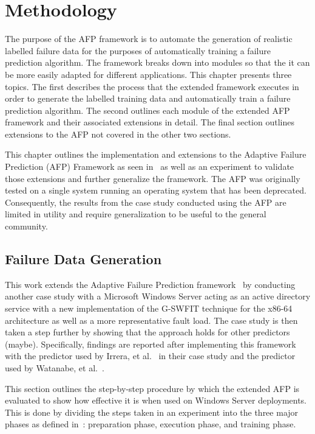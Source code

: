 \chapter{Methodology} \label{chapter3}
The purpose of the AFP framework is to automate the generation of realistic
labelled failure data for the purposes of automatically training a failure
prediction algorithm.  The framework breaks down into modules so that the it
can be more easily adapted for different applications.  This chapter presents
three topics.  The first describes the process that the extended framework
executes in order to generate the labelled training data and automatically
train a failure prediction algorithm.  The second outlines each module of the
extended AFP framework and their associated extensions in detail.  The final
section outlines extensions to the AFP not covered in the other two sections.

This chapter outlines the implementation and extensions to the Adaptive Failure
Prediction (AFP) Framework as seen in~\cite{irrera2015} as well as an
experiment to validate those extensions and further generalize the framework.
The AFP was originally tested on a single system running an operating system
that has been deprecated.  Consequently, the results from the case study
conducted using the AFP are limited in utility and require generalization to be
useful to the general community.

\section{Failure Data Generation} \label{sec:generation}
This work extends the Adaptive Failure Prediction framework~\cite{irrera2015}
by conducting another case study with a Microsoft Windows Server acting as an
active directory service with a new implementation of the G-SWFIT technique for
the x86-64 architecture as well as a more representative fault load.  The case
study is then taken a step further by showing that the approach holds for other
predictors (maybe).  Specifically, findings are reported after implementing
this framework with the predictor used by Irrera, et al.~\cite{irrera2015} in
their case study and the predictor used by Watanabe, et
al.~\cite{watanabe2014}.

This section outlines the step-by-step procedure by which the extended AFP is
evaluated to show how effective it is when used on Windows Server deployments.
This is done by dividing the steps taken in an experiment into the three major
phases as defined in~\cite{irrera2015}: preparation phase, execution phase, and
training phase.

